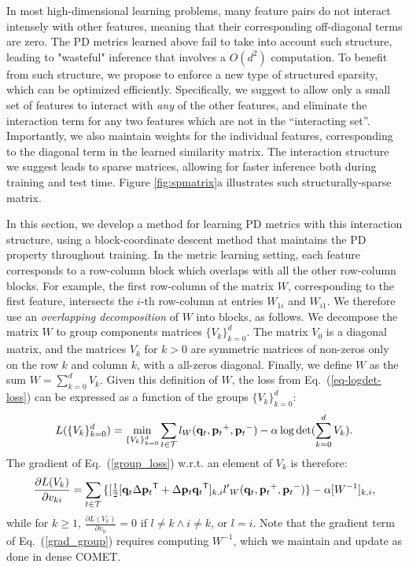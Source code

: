 \documentclass[twoside,11pt]{article}
\newcommand\mat[1]{{#1}}
\renewcommand\vec[1]{\mathbf{#1}}
\newcommand{\T}{{}^\mathsf{T}}
\newcommand{\W}{\mat{W}}
\newcommand{\ignore}[1]{}
\newcommand{\q}{{\vec{q}}}
\newcommand{\p}{{\vec{p}}}
\newcommand{\trip}{{t}}
\newcommand{\qt}{{\q_{\trip}}}
\newcommand{\pt}{{\p_{\trip}}}
\newcommand{\triplet}{(\qt, \pt^{+}, \pt^{-})}
\newcommand{\Vk}{\mat{V_k}}
\newcommand{\Vg}{\{\Vk\}_{k=0}^{d}} %
\renewcommand{\eqref}[1]{Eq.~(\ref{#1})}
\begin{document}
\ignore{
The PD metric learned above does not take into account possible structures often found in feature interactions. }

In most high-dimensional learning problems, many feature pairs do not interact intensely with other features, meaning that their corresponding off-diagonal terms are zero. The PD metrics learned above fail to take into account such structure, leading to  "wasteful" inference that involves a $O(d^2)$ computation. To benefit from such structure, we propose to enforce a new type of structured sparsity, which can be optimized efficiently. Specifically, we suggest to allow only a small set of features to interact with \emph{any} of the other features, and eliminate the interaction term for any two features which are not in the ``interacting set''. Importantly, we also maintain weights for the individual features, corresponding to the diagonal term in the learned similarity matrix. The interaction structure we suggest leads to sparse matrices, allowing for faster inference both during training and test time. 
Figure \ref{fig:spmatrix}a illustrates such structurally-sparse matrix.

In this section, we develop a method for learning PD metrics with this interaction structure, using a block-coordinate descent method that maintains the PD property throughout training.
In the metric learning setting, each feature corresponds to a row-column block which overlaps with all the other row-column blocks. For example, the first row-column of the matrix $\W$, corresponding to the first feature, intersects the $i$-th row-column at entries $W_{1i}$ and $W_{i1}$. We therefore use an \emph{overlapping decomposition} \citep{jacob2009group,obozinski2011group} of $W$ into blocks, as follows. 
We decompose the matrix $\W$ to group components matrices $\Vg$. The matrix $V_0$ is a diagonal matrix, and the matrices $V_k$ for $k>0$ are symmetric matrices of non-zeros only on the row $k$ and column $k$, with a all-zeros diagonal. Finally, we define $\W$ as the sum $\W = \sum_{k=0}^{d}{\Vk}$.
Given this definition of $\W$, the loss from \eqref{eq-logdet-loss} can be expressed as a function of the groups $\Vg$:
\begin{equation}
L(\Vg) = 
  \min_{\Vg} \sum_{\trip \in \cal{T}}   l_{\W}(\qt, \pt^+, \pt^-) - \alpha \log \det(\sum_{k=0}^{d}{\Vk}).
  \label{group_loss}
\end{equation} 
The gradient of \eqref{group_loss} w.r.t. an element of $\mat{V}_k$ is therefore:
\begin{equation}
  \frac{\partial {L (V_k)}}{\partial v_{ki}} = \sum\limits_{t\in \cal{T}}{\{
  [\tfrac{1}{2}[\q_{t}\Delta\p_{t}\T + \Delta\p_{t}\q_{t}\T]_{k,i}  }
  {l'}_W\triplet\} - \alpha [\W^{-1}]_{k,i},
  \label{grad_group}
\end{equation}
while for $k \geq 1$, $\frac{\partial {L (V_k)}}{\partial v_{li}}=0$ if  $l \neq k \wedge i \neq k$, or $l=i$. Note that the gradient term of \eqref{grad_group} requires computing $\W^{-1}$, which we maintain and update as done in dense COMET.
\end{document}
